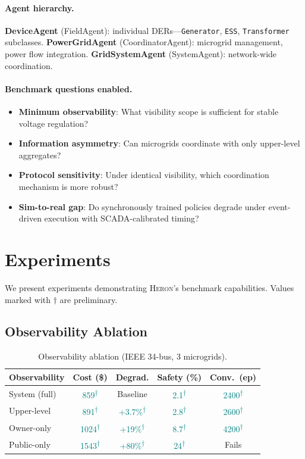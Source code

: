 \documentclass{article}
\newcommand{\heron}{\textsc{Heron}}
\newcommand{\exampleval}[1]{\textcolor{teal}{#1}\textsuperscript{\textcolor{teal}{$\dagger$}}}
\begin{document}
\paragraph{Agent hierarchy.}
\textbf{DeviceAgent} (FieldAgent): individual DERs---\texttt{Generator}, \texttt{ESS}, \texttt{Transformer} subclasses. \textbf{PowerGridAgent} (CoordinatorAgent): microgrid management, power flow integration. \textbf{GridSystemAgent} (SystemAgent): network-wide coordination.

\paragraph{Benchmark questions enabled.}
\begin{itemize}[nosep]
    \item \textbf{Minimum observability}: What visibility scope is sufficient for stable voltage regulation?
    \item \textbf{Information asymmetry}: Can microgrids coordinate with only upper-level aggregates?
    \item \textbf{Protocol sensitivity}: Under identical visibility, which coordination mechanism is more robust?
    \item \textbf{Sim-to-real gap}: Do synchronously trained policies degrade under event-driven execution with SCADA-calibrated timing?
\end{itemize}

\section{Experiments}
\label{sec:experiments}

We present experiments demonstrating \heron{}'s benchmark capabilities. Values marked with $\dagger$ are preliminary.

\subsection{Observability Ablation}

\begin{table}[h]
\centering
\caption{Observability ablation (IEEE 34-bus, 3 microgrids).}
\label{tab:observability-ablation}
\small
\begin{tabular}{@{}lcccc@{}}
\toprule
\textbf{Observability} & \textbf{Cost (\$)} & \textbf{Degrad.} & \textbf{Safety (\%)} & \textbf{Conv.\ (ep)} \\
\midrule
System (full) & \exampleval{859} & Baseline & \exampleval{2.1} & \exampleval{2400} \\
Upper-level & \exampleval{891} & \exampleval{+3.7\%} & \exampleval{2.8} & \exampleval{2600} \\
Owner-only & \exampleval{1024} & \exampleval{+19\%} & \exampleval{8.7} & \exampleval{4200} \\
Public-only & \exampleval{1543} & \exampleval{+80\%} & \exampleval{24} & Fails \\
\bottomrule
\end{tabular}
\end{table}
\end{document}
